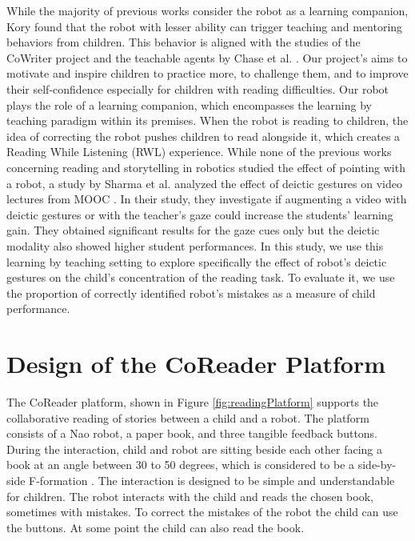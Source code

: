 \documentclass{sigchi}
\begin{document}
While the majority of previous works consider the robot as a learning companion, Kory \cite{kory2014storytelling} found that the robot with lesser ability can trigger teaching and mentoring behaviors from children.
This behavior is aligned with the studies of the CoWriter project and the teachable agents by Chase et al. \cite{hood2015children,chase2009teachable}.
Our project's aims to motivate and inspire children to practice more, to challenge them, and to improve their self-confidence especially for children with reading difficulties. 
Our robot plays the role of a learning companion, which encompasses the learning by teaching paradigm within its premises.  
When the robot is reading to children, the idea of correcting the robot pushes children to read alongside it, which creates a Reading While Listening (RWL) experience.
While none of the previous works concerning reading and storytelling in robotics studied the effect of pointing with a robot, a study by Sharma et al. \cite{sharma2016visual} analyzed the effect of deictic gestures on video lectures from MOOC . 
In their study, they investigate if augmenting a video with deictic gestures or with the teacher's gaze could increase the students' learning gain. They obtained significant results for the gaze cues only but the deictic modality also showed higher student performances.
In this study, we use this learning by teaching setting to explore specifically the effect of robot's deictic gestures on the child's concentration of the reading task. 
To evaluate it, we use the proportion of correctly identified robot's mistakes as a measure of child performance.






\section{Design of the CoReader Platform}

The CoReader platform, shown in Figure \ref{fig:readingPlatform} supports the collaborative reading of stories between a child and a robot. 
The platform consists of a Nao robot, a paper book, and three tangible feedback buttons.
During the interaction, child and robot are sitting beside each other facing a book at an angle between 30 to 50 degrees, which is considered to be a side-by-side F-formation \cite{kendon1990conducting}.
The interaction is designed to be simple and understandable for children. 
The robot interacts with the child and reads the chosen book, sometimes with mistakes. To correct the mistakes of the robot the child can use the buttons. 
At some point the child can also read the book.
\end{document}
